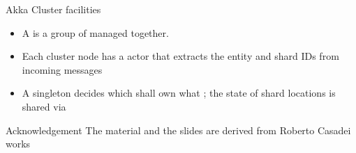 \documentclass[presentation, 9pt]{beamer}\mode<presentation>{\usetheme{AMSBolognaFC}}
\begin{document}
\begin{frame}[c, fragile]{Akka Cluster facilities}
\begin{itemize}
 \begin{itemize}
	\item A  is a group of  managed together.
 	\item Each cluster node has a  actor that extracts the entity and shard IDs from incoming messages
 	\item A singleton  decides which  shall own what ; the
 state of shard locations is shared via 
 \end{itemize}
\end{itemize}
\end{frame}
\begin{frame}[c]{Acknowledgement}
	The material and the slides are derived from Roberto Casadei works \href{https://www.slideshare.net/RobertoCasadei/akka-actors-an-introduction}{\faLink}
\end{frame}
\section*{}

\frame{\titlepage}

\section*{\refname}

\begin{frame}{\refname}
	\tiny
	\nocite{*}
	\printbibliography
\end{frame}

\end{document}
